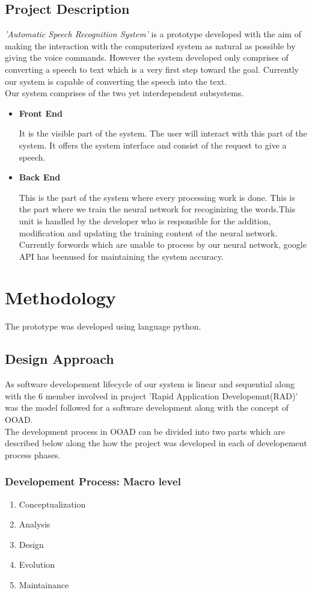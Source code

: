 \documentclass[a4paper,12pt,onepage]{article}
\begin{document}
	\subsection{Project Description}
	\emph{'Automatic Speech Recognition System'} is a prototype developed with the aim of making the interaction with the computerized system as natural as possible by giving the voice commands. However the system developed only comprises of converting a speech to text which is a very first step toward the goal. Currently our system is capable of converting the speech into the text.\\
Our system comprises of the two yet interdependent subsystems.
\begin{itemize}
\item \textbf{Front End} 
\par
It is the visible part of the system. The user will interact with this part of the system. It offers the system interface and consist of the request to give a speech.
\item \textbf{Back End}
\par
This is the part of the system where every processing work is done. This is the part where we train the neural network for recoginizing the words.This unit is handled by the developer who is responsible for the addition, modification and updating the training content of the neural network. Currently forwords which are unable to process by our neural network, google API has beenused for maintaining the system accuracy.
\end{itemize}
	\newpage
\section{Methodology}
The prototype was developed using language python.
\subsection{Design Approach}
As software developement lifecycle of our system is linear and sequential along with the 6 member involved in project 'Rapid Application Developemnt(RAD)' was the model followed for a software development along with the concept of OOAD.\\
The development process in OOAD can be divided into two parts which are described below along the how the project was developed in each of developement process phases.
\subsubsection{Developement Process: Macro level}
\begin{enumerate}
\item Conceptualization
\newpage
\item Analysis
\newpage
\item Design
\newpage
\item Evolution
\newpage
\item Maintainance
\newpage
\end{enumerate}
\end{document}
